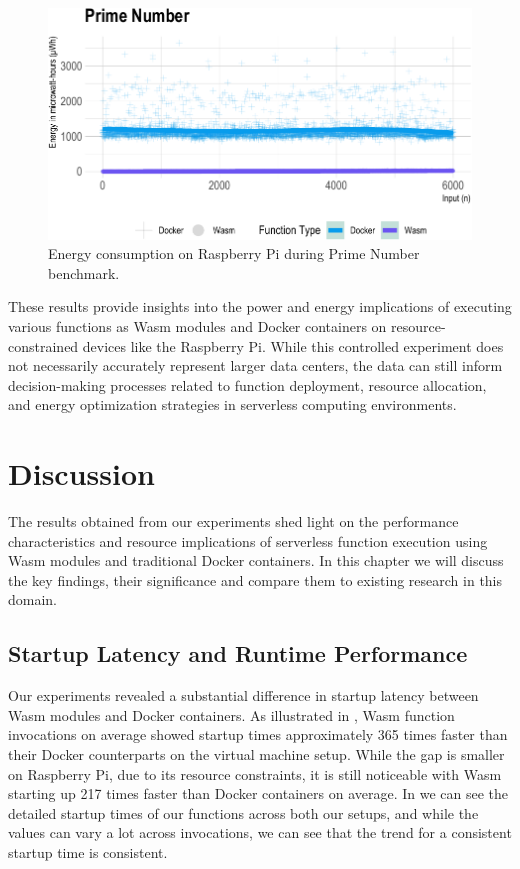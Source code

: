 \documentclass[
  table]{report}
\begin{document}
\begin{figure}[H]

{\centering \includegraphics{thesis_files/figure-latex/prime-energy-1} 

}

\caption{Energy consumption on Raspberry Pi during Prime Number benchmark.}\label{fig:prime-energy}
\end{figure}

These results provide insights into the power and energy implications of
executing various functions as \ac{Wasm} modules and Docker containers
on resource-constrained devices like the Raspberry Pi. While this
controlled experiment does not necessarily accurately represent larger
data centers, the data can still inform decision-making processes
related to function deployment, resource allocation, and energy
optimization strategies in serverless computing environments.

\newpage
\chapter{Discussion}
\label{chap:discussion}

The results obtained from our experiments shed light on the performance
characteristics and resource implications of serverless function
execution using \ac{Wasm} modules and traditional Docker containers. In
this chapter we will discuss the key findings, their significance and
compare them to existing research in this domain.

\section{Startup Latency and Runtime Performance}

Our experiments revealed a substantial difference in startup latency
between \ac{Wasm} modules and Docker containers. As illustrated in
, \ac{Wasm} function invocations on
average showed startup times approximately 365 times faster than their
Docker counterparts on the virtual machine setup. While the gap is
smaller on Raspberry Pi, due to its resource constraints, it is still
noticeable with \ac{Wasm} starting up 217 times faster than Docker
containers on average. In 
we can see the detailed startup times of our functions across both our
setups, and while the values can vary a lot across invocations, we can
see that the trend for a consistent startup time is consistent.
\end{document}
